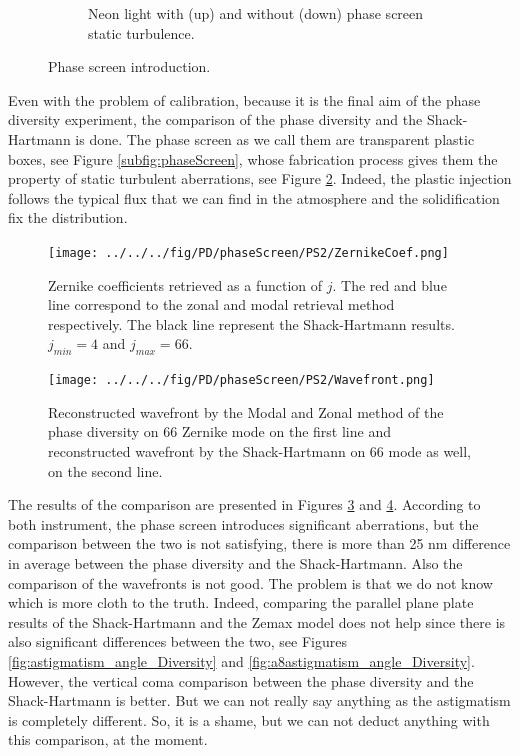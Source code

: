 \begin{figure}
\begin{subfigure}{0.45\textwidth}
        \caption{Neon light with (up) and without (down) phase screen static turbulence.}
        \label{subfig:StaticTurbulenceEx}
    \end{subfigure}
    \decoRule
    \caption{Phase screen introduction.}
\end{figure}

Even with the problem of calibration, because it is the final aim of the phase diversity experiment, the comparison of the phase diversity and the Shack-Hartmann is done. The phase screen as we call them are transparent plastic boxes, see Figure \ref{subfig:phaseScreen}, whose fabrication process gives them the property of static turbulent aberrations, see Figure \ref{subfig:StaticTurbulenceEx}. Indeed, the plastic injection follows the typical flux that we can find in the atmosphere and the solidification fix the distribution.

\begin{figure}
\begin{center}
\texttt{[image: ../../../fig/PD/phaseScreen/PS2/ZernikeCoef.png]}
\decoRule
\caption{Zernike coefficients retrieved as a function of $j$. The red and blue line correspond to the zonal and modal retrieval method respectively. The black line represent the Shack-Hartmann results. $j_{min}=4$ and $j_{max}=66$. }
\label{fig:ZernikeCoef}
\end{center}
\end{figure}

\begin{figure}
\begin{center}
\texttt{[image: ../../../fig/PD/phaseScreen/PS2/Wavefront.png]}
\decoRule
\caption{Reconstructed wavefront by the Modal and Zonal method of the phase diversity on 66 Zernike mode on the first line and reconstructed wavefront by the Shack-Hartmann on 66 mode as well, on the second line.}
\label{fig:Wavefront}
\end{center}
\end{figure}

The results of the comparison are presented in Figures \ref{fig:ZernikeCoef} and \ref{fig:Wavefront}. According to both instrument, the phase screen introduces significant aberrations, but the comparison between the two is not satisfying, there is more than 25 nm difference in average between the phase diversity and the Shack-Hartmann. Also the comparison of the wavefronts is not good. The problem is that we do not know which is more cloth to the truth. Indeed, comparing the parallel plane plate results of the Shack-Hartmann and the Zemax model does not help since there is also significant differences between the two, see Figures \ref{fig:astigmatism_angle_Diversity} and \ref{fig:a8astigmatism_angle_Diversity}. However, the vertical coma comparison between the phase diversity and the Shack-Hartmann is better. But we can not really say anything as the astigmatism is completely different. So, it is a shame, but we can not deduct anything with this comparison, at the moment. 

